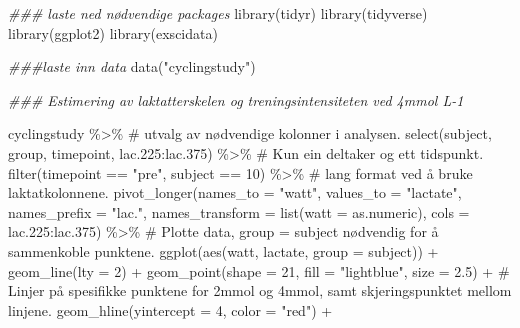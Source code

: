 \documentclass[
  letterpaper,
  DIV=11,
  numbers=noendperiod]{scrreprt}
\newenvironment{Shaded}{\begin{snugshade}}{\end{snugshade}}
\newcommand{\AttributeTok}[1]{\textcolor[rgb]{0.40,0.45,0.13}{#1}}
\newcommand{\CommentTok}[1]{\textcolor[rgb]{0.37,0.37,0.37}{#1}}
\newcommand{\DecValTok}[1]{\textcolor[rgb]{0.68,0.00,0.00}{#1}}
\newcommand{\DocumentationTok}[1]{\textcolor[rgb]{0.37,0.37,0.37}{\textit{#1}}}
\newcommand{\FloatTok}[1]{\textcolor[rgb]{0.68,0.00,0.00}{#1}}
\newcommand{\FunctionTok}[1]{\textcolor[rgb]{0.28,0.35,0.67}{#1}}
\newcommand{\NormalTok}[1]{\textcolor[rgb]{0.00,0.23,0.31}{#1}}
\newcommand{\SpecialCharTok}[1]{\textcolor[rgb]{0.37,0.37,0.37}{#1}}
\newcommand{\StringTok}[1]{\textcolor[rgb]{0.13,0.47,0.30}{#1}}
\begin{document}
\begin{Shaded}
\begin{Highlighting}[]
\DocumentationTok{\#\#\# laste ned nødvendige packages}
\FunctionTok{library}\NormalTok{(tidyr)}
\FunctionTok{library}\NormalTok{(tidyverse)}
\FunctionTok{library}\NormalTok{(ggplot2)}
\FunctionTok{library}\NormalTok{(exscidata)}


\DocumentationTok{\#\#\#laste inn data}
\FunctionTok{data}\NormalTok{(}\StringTok{"cyclingstudy"}\NormalTok{)}


\DocumentationTok{\#\#\# Estimering av laktatterskelen og treningsintensiteten ved 4mmol L{-}1 }

\NormalTok{cyclingstudy }\SpecialCharTok{\%\textgreater{}\%}
  \CommentTok{\# utvalg av nødvendige kolonner i analysen.}
  \FunctionTok{select}\NormalTok{(subject, group, timepoint, lac}\FloatTok{.225}\SpecialCharTok{:}\NormalTok{lac}\FloatTok{.375}\NormalTok{) }\SpecialCharTok{\%\textgreater{}\%}
  \CommentTok{\# Kun ein deltaker og ett tidspunkt.}
  \FunctionTok{filter}\NormalTok{(timepoint }\SpecialCharTok{==} \StringTok{"pre"}\NormalTok{, subject }\SpecialCharTok{==} \DecValTok{10}\NormalTok{) }\SpecialCharTok{\%\textgreater{}\%}
  \CommentTok{\# lang format ved å bruke laktatkolonnene.}
  \FunctionTok{pivot\_longer}\NormalTok{(}\AttributeTok{names\_to =} \StringTok{"watt"}\NormalTok{,}
               \AttributeTok{values\_to =} \StringTok{"lactate"}\NormalTok{,}
               \AttributeTok{names\_prefix =} \StringTok{"lac."}\NormalTok{,}
               \AttributeTok{names\_transform =} \FunctionTok{list}\NormalTok{(}\AttributeTok{watt =}\NormalTok{ as.numeric),}
               \AttributeTok{cols =}\NormalTok{ lac}\FloatTok{.225}\SpecialCharTok{:}\NormalTok{lac}\FloatTok{.375}\NormalTok{) }\SpecialCharTok{\%\textgreater{}\%}
  \CommentTok{\# Plotte data, group = subject nødvendig for å sammenkoble punktene.}
  \FunctionTok{ggplot}\NormalTok{(}\FunctionTok{aes}\NormalTok{(watt, lactate, }\AttributeTok{group =}\NormalTok{ subject)) }\SpecialCharTok{+}
  \FunctionTok{geom\_line}\NormalTok{(}\AttributeTok{lty =} \DecValTok{2}\NormalTok{) }\SpecialCharTok{+}
  \FunctionTok{geom\_point}\NormalTok{(}\AttributeTok{shape =} \DecValTok{21}\NormalTok{, }\AttributeTok{fill =} \StringTok{"lightblue"}\NormalTok{, }\AttributeTok{size =} \FloatTok{2.5}\NormalTok{) }\SpecialCharTok{+}
  \CommentTok{\# Linjer på spesifikke punktene for 2mmol og 4mmol, samt skjeringspunktet mellom linjene.}
  \FunctionTok{geom\_hline}\NormalTok{(}\AttributeTok{yintercept =} \DecValTok{4}\NormalTok{, }\AttributeTok{color =} \StringTok{"red"}\NormalTok{) }\SpecialCharTok{+}

\end{Highlighting}
\end{Shaded}
\end{document}
